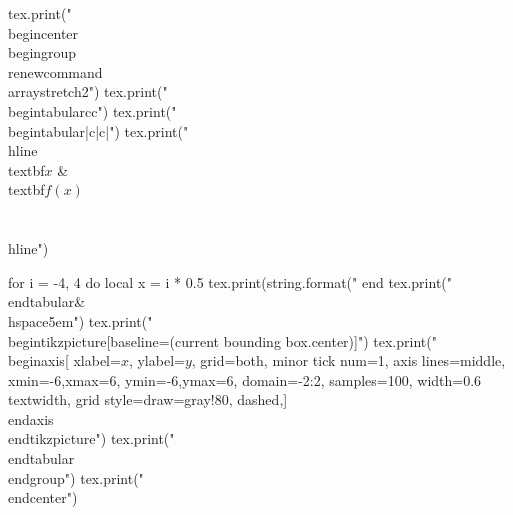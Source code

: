 \documentclass[twoside, 10pt]{article}
\begin{document}
\begin{luacode*}
tex.print("\\begin{center}\\begingroup\\renewcommand{\\arraystretch}{2}")
tex.print("\\begin{tabular}{cc}")
tex.print("\\begin{tabular}{|c|c|}")
tex.print("\\hline\\textbf{$x$} & \\textbf{$f(x)$} \\\\ \\hline")

for i = -4, 4 do
  local x = i * 0.5
  tex.print(string.format("%
end
tex.print("\\end{tabular}&\\hspace{5em}")
tex.print("\\begin{tikzpicture}[baseline={(current bounding box.center)}]")
tex.print("\\begin{axis}[    xlabel={$x$},    ylabel={$y$},    grid=both,    minor tick num=1,    axis lines=middle,     xmin=-6,xmax=6,    ymin=-6,ymax=6,    domain=-2:2,    samples=100,    width=0.6\\textwidth,    grid style={draw=gray!80, dashed},]\\end{axis}\\end{tikzpicture}")
tex.print("\\end{tabular}\\endgroup")
tex.print("\\end{center}")
\end{luacode*}
\end{document}
